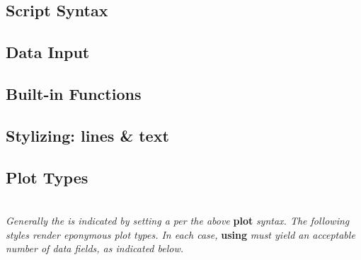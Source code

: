 \subsection*{Script Syntax}





\subsection*{Data Input}



\subsection*{Built-in Functions}


\subsection*{Stylizing: lines \& text}


\subsection*{Plot Types}
\\
\textit{Generally the  is indicated by setting a  per the above }\textbf{plot}\textit{ syntax. The following styles render eponymous plot types. In each case, }\textbf{using}\textit{ must yield an acceptable number of data fields, as indicated below.}

